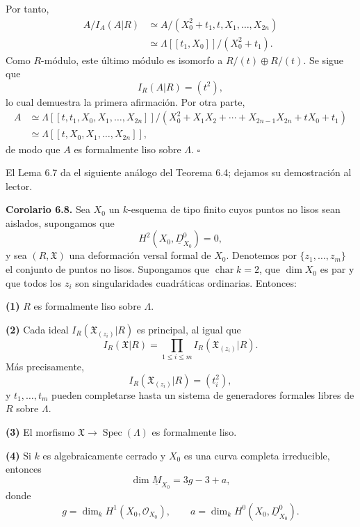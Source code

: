 Por tanto,
\[
\begin{aligned}
A/I_A(A|R)
&\simeq A/(X_0^2+t_1,t,X_1,\ldots,X_{2n})\\
&\simeq\Lambda[[t_1,X_0]]/(X_0^2+t_1).
\end{aligned}
\]
Como $R$-módulo, este último módulo es isomorfo a
$R/(t)\oplus R/(t)$. Se sigue que
\[
I_R(A|R)=(t^2),
\]
lo cual demuestra la primera afirmación. Por otra parte,
\[
\begin{aligned}
A
&\simeq
\Lambda[[t,t_1,X_0,X_1,\ldots,X_{2n}]]/
 (X_0^2+X_1X_2+\cdots+X_{2n-1}X_{2n}+tX_0+t_1)\\
&\simeq\Lambda[[t,X_0,X_1,\ldots,X_{2n}]],
\end{aligned}
\]
de modo que $A$ es formalmente liso sobre $\Lambda$.
\hfill$\square$

El Lema 6.7 da el siguiente análogo del Teorema 6.4; dejamos su
demostración al lector.

\par\medskip
\noindent\textbf{Corolario 6.8.}
Sea $X_0$ un $k$-esquema de tipo finito cuyos puntos no lisos sean
aislados, supongamos que
\[
H^2(X_0,\underline D^0_{X_0})=0,
\]
y sea $(R,\mathfrak X)$ una deformación versal formal de $X_0$.
Denotemos por $\{z_1,\ldots,z_m\}$ el conjunto de puntos no lisos.
Supongamos que $\operatorname{char}k=2$, que $\dim X_0$ es par y que
todos los $z_i$ son singularidades cuadráticas ordinarias. Entonces:

\smallskip
\noindent\textbf{(1)} $R$ es formalmente liso sobre $\Lambda$.

\smallskip
\noindent\textbf{(2)} Cada ideal
$I_R(\mathfrak X_{(z_i)}|R)$ es principal, al igual que
\[
I_R(\mathfrak X|R)
=\prod_{1\leq i\leq m}I_R(\mathfrak X_{(z_i)}|R).
\]
Más precisamente,
\[
I_R(\mathfrak X_{(z_i)}|R)=(t_i^2),
\]
y $t_1,\ldots,t_m$ pueden completarse hasta un sistema de generadores
formales libres de $R$ sobre $\Lambda$.

\smallskip
\noindent\textbf{(3)} El morfismo
$\mathfrak X\longrightarrow\operatorname{Spec}(\Lambda)$ es
formalmente liso.

\smallskip
\noindent\textbf{(4)} Si $k$ es algebraicamente cerrado y $X_0$ es
una curva completa irreducible, entonces
\[
\dim\underline M_{X_0}=3g-3+a,
\]
donde
\[
g=\dim_kH^1(X_0,\mathcal O_{X_0}),
\qquad
a=\dim_kH^0(X_0,\underline D^0_{X_0}).
\]
